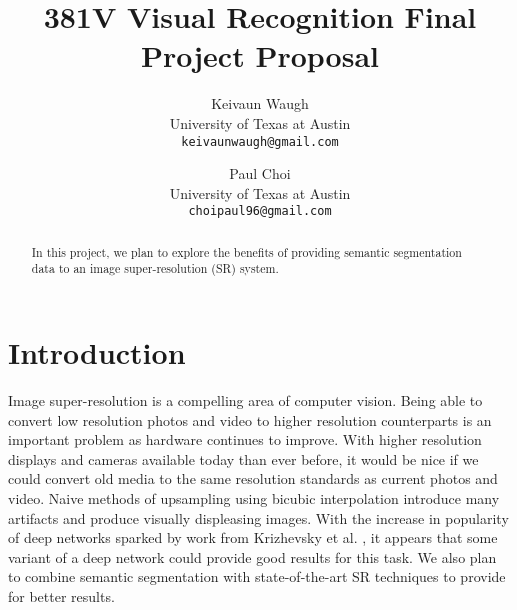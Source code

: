\documentclass[10pt,twocolumn,letterpaper]{article}
\begin{document}
\title{381V Visual Recognition Final Project Proposal}

\author{Keivaun Waugh\\
University of Texas at Austin\\
{\tt\small keivaunwaugh@gmail.com}
\and
Paul Choi\\
University of Texas at Austin\\
{\tt\small choipaul96@gmail.com}
}

\maketitle

\begin{abstract}
    In this project, we plan to explore the benefits of providing semantic segmentation data to an image super-resolution (SR) system. 
\end{abstract}

\section{Introduction}
Image super-resolution is a compelling area of computer vision. Being able to convert low resolution photos and video to higher resolution counterparts is an important problem as hardware continues to improve. With higher resolution displays and cameras available today than ever before, it would be nice if we could convert old media to the same resolution standards as current photos and video. Naive methods of upsampling using bicubic interpolation introduce many artifacts and produce visually displeasing images. With the increase in popularity of deep networks sparked by work from Krizhevsky et al. \cite{AlexNet}, it appears that some variant of a deep network could provide good results for this task. We also plan to combine semantic segmentation with state-of-the-art SR techniques to provide for better results.

\end{document}
